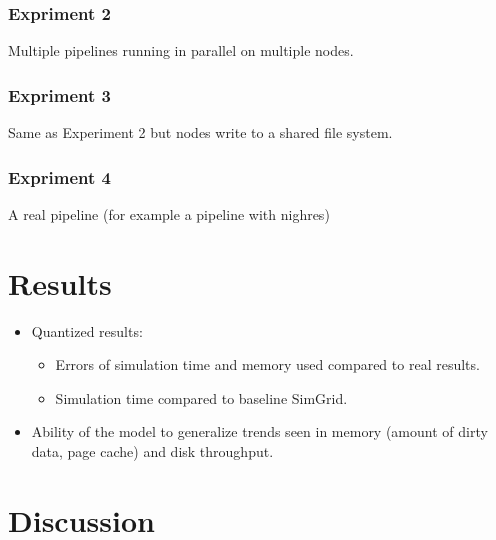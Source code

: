 \documentclass[11pt, a4paper]{article}
\begin{document}
			\subsubsection{Expriment 2}
				Multiple pipelines running in parallel on multiple nodes.
			\subsubsection{Expriment 3}
				Same as Experiment 2 but nodes write to a shared file system.
			\subsubsection{Expriment 4}
				A real pipeline (for example a pipeline with nighres)

	\section{Results}
	
		\begin{itemize}

			\item Quantized results: 
				\begin{itemize}
					\item Errors of simulation time and memory used compared to real results.
					\item Simulation time compared to baseline SimGrid.
				\end{itemize} 

			\item Ability of the model to generalize trends seen in memory (amount of dirty data, page cache) and disk throughput.

		\end{itemize}

	\section{Discussion}
\end{document}

